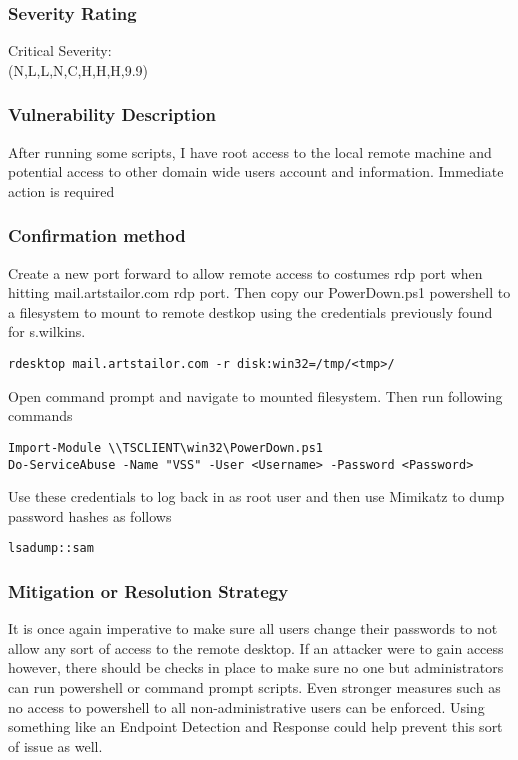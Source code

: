 \documentclass[notitlepage]{article}
\begin{document}
	\subsubsection*{Severity Rating}
        Critical Severity: \\
		\cvss(N,L,L,N,C,H,H,H,9.9)
		
  	\subsubsection*{Vulnerability Description}
  		After running some scripts, I have root access to the local remote machine and potential
        access to other domain wide users account and information. Immediate action is required

  	\subsubsection*{Confirmation method}
  	Create a new port forward to allow remote access to costumes rdp port when hitting mail.artstailor.com
    rdp port. Then copy our PowerDown.ps1 powershell to a filesystem to mount to remote destkop using
    the credentials previously found for s.wilkins.

\begin{verbatim}
rdesktop mail.artstailor.com -r disk:win32=/tmp/<tmp>/
\end{verbatim}
    Open command prompt and navigate to mounted filesystem. Then run following commands

\begin{verbatim}
Import-Module \\TSCLIENT\win32\PowerDown.ps1
Do-ServiceAbuse -Name "VSS" -User <Username> -Password <Password>
\end{verbatim}
    Use these credentials to log back in as root user and then use Mimikatz to dump password hashes as follows

\begin{verbatim}
lsadump::sam
\end{verbatim}

    \subsubsection*{Mitigation or Resolution Strategy}
    It is once again imperative to make sure all users change their passwords to not allow any sort 
    of access to the remote desktop. If an attacker were to gain access however, there should be checks
    in place to make sure no one but administrators can run powershell or command prompt scripts. Even
    stronger measures such as no access to powershell to all non-administrative users can be enforced.
    Using something like an Endpoint Detection and Response could help prevent this sort of issue as well.
\end{document}
